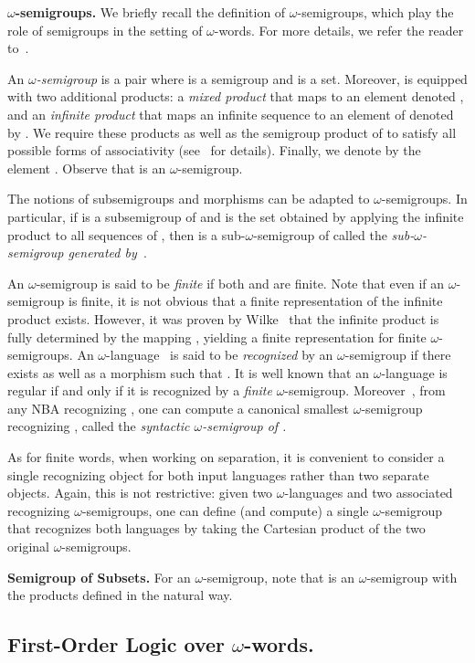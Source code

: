 \documentclass{CSML}
\newcommand\ilang{\ensuremath{\omega}-language\xspace}
\newcommand\iwords{\ensuremath{\omega}-words\xspace}
\newcommand\ilangs{\ensuremath{\omega}-languages\xspace}
\newcommand\sisemi{sub-\ensuremath{\omega}-semigroup\xspace}
\newcommand\isemi{\ensuremath{\omega}-semigroup\xspace}
\newcommand\isemis{\ensuremath{\omega}-semigroups\xspace}
\theoremstyle{plain}
\begin{document}
\medskip
\noindent
{\textbf{\isemis.}} We briefly recall the definition of \isemis, which
play the role of semigroups in the setting of \iwords. For more details, we
refer the reader to~\cite{Perrin&Pin:Infinite-Words:2004:a}.

An \emph{\isemi} is a pair  where  is a
semigroup and  is a set. Moreover,  is
equipped with two additional products: a \emph{mixed product}  that maps  to an element denoted , and an \emph{infinite
  product}  that maps an
infinite sequence  to an element
of  denoted by . We require these products
as well as the semigroup product of  to satisfy all possible
forms of associativity (see~\cite{Perrin&Pin:Infinite-Words:2004:a}
for details). Finally, we denote by  the element
. Observe that  is an \isemi.

The notions of subsemigroups and morphisms can be adapted to
\isemis. In particular, if  is a subsemigroup of  and
 is the set obtained by applying the infinite product to all
sequences of , then  is a \sisemi of
 called the \emph{\sisemi generated by~}.

An \isemi is said to be \emph{finite} if both  and 
are finite. Note that even if an \isemi is finite, it is not obvious
that a finite representation of the infinite product exists. However,
it was proven by Wilke~\cite{womega} that the infinite product is
fully determined by the mapping , yielding
a finite representation for finite \isemis. An \ilang~ is said to be
\emph{recognized} by an \isemi  if there exists  as well as a morphism  such that . It is well known
that an \ilang is regular if and only if it is recognized by a
\emph{finite} \isemi. Moreover~\cite{womega}, from any NBA recognizing
, one can compute a canonical smallest \isemi recognizing ,
called the \emph{syntactic \isemi of .}

As for finite words, when working on separation, it is convenient to
consider a single recognizing object for both input languages rather
than two separate objects. Again, this is not restrictive: given two
\ilangs and two associated recognizing \isemis, one can define (and
compute) a single \isemi that recognizes both languages by taking the
Cartesian product of the two original \isemis.

\medskip
\noindent
{\bf Semigroup of Subsets.} For an \isemi , note
that  is an \isemi with the products
defined in the natural way.

\subsection{\texorpdfstring{First-Order Logic over
    \iwords.}{First-Order Logic over Infinite Words.}}
\end{document}
